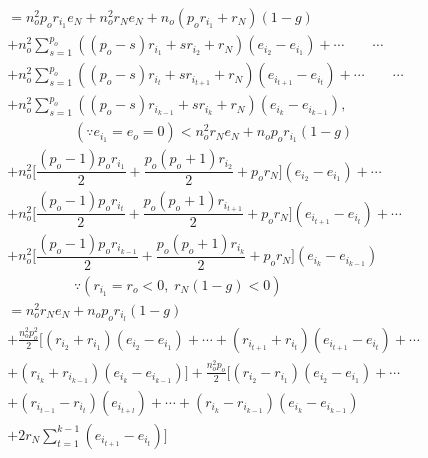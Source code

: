 \pageoriginale
\begin{align*}
& = n_o^2 p_o r_{i_1} e_N +  n_o^2 r_N e_N +  n_o(p_o r_{i_1}+
r_N) (1-g)\\
& + n^2_o \sum\limits_{s=1}^{p_o} ((p_o-s) r_{i_1} + sr_{i_2} +
r_N) (e_{i_2} - e_{i_1}) + \cdots \qquad \cdots\\
& + n^2_o \sum\limits_{s=1}^{p_o} ((p_o-s)r_{i_t} + sr_{i_{t+1}} +
r_N) (e_{i_{t+1}} - e_{i_t}) + \cdots \qquad \cdots\\
& + n^2_o \sum\limits_{s=1}^{p_o} ((p_o-s)r_{i_{k-1}} + sr_{i_k} +
r_N) (e_{i_k} - e_{i_{k-1}}), \\
& \hspace{2cm}  (\because e_{i_1} = e_o = 0) < n^2_o r_N
e_N + n_op_o r_{i_1} (1-g)\\
& + n_o^2 \bigg[ \dfrac{(p_o-1) p_o r_{i_1}}{2} + \dfrac{p_o
    (p_o+1)r_{i_{2}}}{2} + p_o r_N\bigg] (e_{i_2} - e_{i_1}) + \cdots\\
& + n_o^2 \bigg[ \dfrac{(p_o-1) p_o r_{i_{t}}}{2} + \dfrac{p_o
    (p_o+1)r_{i_{t+1}}}{2} + p_o r_N \bigg] (e_{i_{t+1}} -
e_{i_t}) + \cdots\\
& + n_o^2 \bigg[ \dfrac{(p_o-1) p_o r_{i_{k-1}}}{2} + \dfrac{ p_o
    (p_o+1)r_{i_k}}{2}  + p_o r_N \bigg] (e_{i_k} - e_{i_{k-1}}) \\
& \hspace{2cm}
\because (r_{i_1} = r_o < 0, \; r_N (1-g) < 0)\\
& = n^2_o r_N e_N + n_o p_o r_{i_l} (1-g)\\
& + \frac{n^2_o p^2_o}{2} \bigg[ (r_{i_2} + r_{i_1}) (e_{i_2} - e_{i_1})
  + \cdots +  (r_{i_{t+1}} + r_{i_t}) ( e_{i_{t+1}} - e_{i_t})
  + \cdots\\
 & + (r_{i_k} + r_{i_{k-1}}) (e_{i_k} -  e_{i_{k-1}}) \bigg]
 + \frac{n^2_op_o}{2} \bigg[  (r_{i_2}- r_{i_1}) (e_{i_2} - e_{i_{1}})
   + \cdots \\
& +  (r_{i_{t-1}} -  r_{i_{t}}) (e_{i_{t+l}}) + 
 \cdots + (r_{i_k} - r_{i_{k-1}}) (e_{i_k}
  - e_{i_{k-1}})\\
& + 2r_N \sum\limits_{t=1}^{k-1} (e_{i_{t+1}} -
  e_{i_t})\bigg]
\end{align*}\pageoriginale
